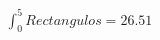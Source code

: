 \documentclass[preview]{standalone}
\begin{document}
\begin{align*}
\int_0^5 Rectangulos =  26.51
\end{align*}
\end{document}
